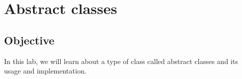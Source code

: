 \documentclass[11pt,fleqn]{book} %
\begin{document}


\pagestyle{empty} %

\tableofcontents %

\cleardoublepage %







\chapter{Abstract classes}
\section{Objective}
In this lab, we will learn about a type of class called abstract classes and its usage and implementation.
\end{document}
